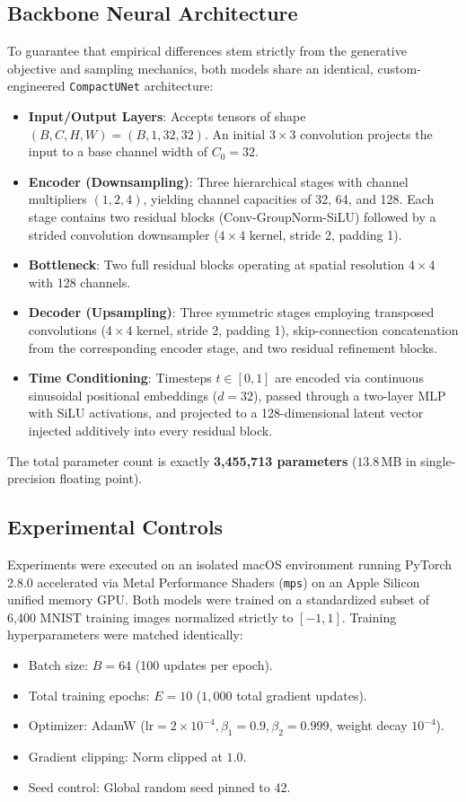 \documentclass[conference]{IEEEtran}
\begin{document}
\subsection{Backbone Neural Architecture}
To guarantee that empirical differences stem strictly from the generative objective and sampling mechanics, both models share an identical, custom-engineered \texttt{CompactUNet} architecture:
\begin{itemize}
    \item \textbf{Input/Output Layers}: Accepts tensors of shape $(B, C, H, W) = (B, 1, 32, 32)$. An initial $3 \times 3$ convolution projects the input to a base channel width of $C_0 = 32$.
    \item \textbf{Encoder (Downsampling)}: Three hierarchical stages with channel multipliers $(1, 2, 4)$, yielding channel capacities of 32, 64, and 128. Each stage contains two residual blocks (Conv-GroupNorm-SiLU) followed by a strided convolution downsampler ($4 \times 4$ kernel, stride 2, padding 1).
    \item \textbf{Bottleneck}: Two full residual blocks operating at spatial resolution $4 \times 4$ with 128 channels.
    \item \textbf{Decoder (Upsampling)}: Three symmetric stages employing transposed convolutions ($4 \times 4$ kernel, stride 2, padding 1), skip-connection concatenation from the corresponding encoder stage, and two residual refinement blocks.
    \item \textbf{Time Conditioning}: Timesteps $t \in [0, 1]$ are encoded via continuous sinusoidal positional embeddings ($d = 32$), passed through a two-layer MLP with SiLU activations, and projected to a 128-dimensional latent vector injected additively into every residual block.
\end{itemize}
The total parameter count is exactly \textbf{3,455,713 parameters} ($13.8$\,MB in single-precision floating point).

\subsection{Experimental Controls}
Experiments were executed on an isolated macOS environment running PyTorch 2.8.0 accelerated via Metal Performance Shaders (\texttt{mps}) on an Apple Silicon unified memory GPU. Both models were trained on a standardized subset of 6,400 MNIST training images normalized strictly to $[-1, 1]$. Training hyperparameters were matched identically:
\begin{itemize}
    \item Batch size: $B = 64$ (100 updates per epoch).
    \item Total training epochs: $E = 10$ ($1,000$ total gradient updates).
    \item Optimizer: AdamW ($\text{lr} = 2 \times 10^{-4}, \beta_1 = 0.9, \beta_2 = 0.999$, weight decay $10^{-4}$).
    \item Gradient clipping: Norm clipped at $1.0$.
    \item Seed control: Global random seed pinned to 42.
\end{itemize}
\end{document}
